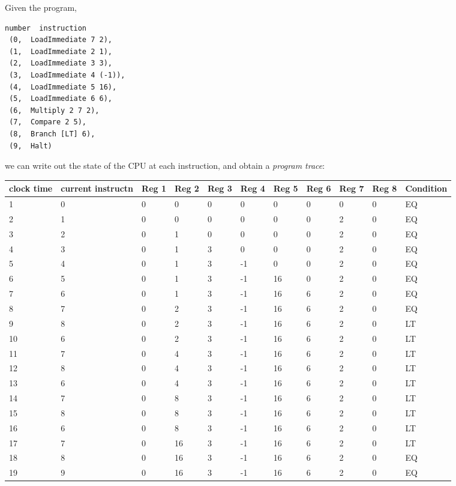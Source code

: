 \documentclass[12pt]{amsbook}
\begin{document}
{\medskip
Given the program,
\begin{verbatim}
number  instruction
 (0,  LoadImmediate 7 2),  
 (1,  LoadImmediate 2 1),  
 (2,  LoadImmediate 3 3),  
 (3,  LoadImmediate 4 (-1)), 
 (4,  LoadImmediate 5 16),    
 (5,  LoadImmediate 6 6),    
 (6,  Multiply 2 7 2),
 (7,  Compare 2 5),
 (8,  Branch [LT] 6),
 (9,  Halt)
\end{verbatim}
we can write out the state of the CPU at each instruction, and obtain a \emph{program trace}: \\
\noindent
\!\!\!\begin{tabular}{|p{}|p{}|p{}|p{}|p{}|p{}|p{}|p{}|p{}|p{}|p{}|}
\hline
clock time & current {\tiny instructn} & Reg 1 & Reg 2 & Reg 3 & Reg 4 & Reg 5 & Reg 6 & Reg 7 & Reg 8 & {\scriptsize Condition} \\
\hline
1 & 0 & 0 & 0 & 0 & 0 & 0 & 0 & 0 & 0 & EQ \\ \hline
2 & 1 & 0 & 0 & 0 & 0 & 0 & 0 & 2 & 0 & EQ \\ \hline
3 & 2 & 0 & 1 & 0 & 0 & 0 & 0 & 2 & 0 & EQ \\ \hline
4 & 3 & 0 & 1 & 3 & 0 & 0 & 0 & 2 & 0 & EQ \\ \hline
5 & 4 & 0 & 1 & 3 & -1 & 0 & 0 & 2 & 0 & EQ \\ \hline
6 & 5 & 0 & 1 & 3 & -1 & 16 & 0 & 2 & 0 & EQ \\ \hline
7 & 6 & 0 & 1 & 3 & -1 & 16 & 6 & 2 & 0 & EQ \\ \hline
8 & 7 & 0 & 2 & 3 & -1 & 16 & 6 & 2 & 0 & EQ \\ \hline
9 & 8 & 0 & 2 & 3 & -1 & 16 & 6 & 2 & 0 & LT \\ \hline
10 & 6 & 0 & 2 & 3 & -1 & 16 & 6 & 2 & 0 & LT \\ \hline
11 & 7 & 0 & 4 & 3 & -1 & 16 & 6 & 2 & 0 & LT \\ \hline
12 & 8 & 0 & 4 & 3 & -1 & 16 & 6 & 2 & 0 & LT \\ \hline
13 & 6 & 0 & 4 & 3 & -1 & 16 & 6 & 2 & 0 & LT \\ \hline
14 & 7 & 0 & 8 & 3 & -1 & 16 & 6 & 2 & 0 & LT \\ \hline
15 & 8 & 0 & 8 & 3 & -1 & 16 & 6 & 2 & 0 & LT \\ \hline
16 & 6 & 0 & 8 & 3 & -1 & 16 & 6 & 2 & 0 & LT \\ \hline
17 & 7 & 0 & 16 & 3 & -1 & 16 & 6 & 2 & 0 & LT \\ \hline
18 & 8 & 0 & 16 & 3 & -1 & 16 & 6 & 2 & 0 & EQ \\ \hline
19 & 9 & 0 & 16 & 3 & -1 & 16 & 6 & 2 & 0 & EQ \\ \hline
\end{tabular}
\vspace{1mm}

}
\end{document}
